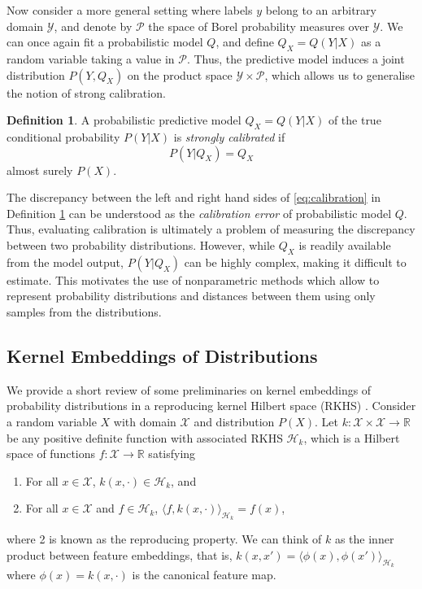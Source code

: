 \documentclass[twocolumn]{article}
\theoremstyle{definition}
\newtheorem{definition}[theorem]{Definition}
\begin{document}
Now consider a more general setting where labels $y$ belong to an arbitrary domain $\mathcal{Y}$, and denote by $\mathcal{P}$ the space of Borel probability measures over $\mathcal{Y}$. We can once again fit a probabilistic model $Q$, and define $Q_X = Q(Y|X)$ as a random variable taking a value in $\mathcal{P}$. Thus, the predictive model induces a joint distribution $P(Y, Q_X)$ on the product space $\mathcal{Y} \times \mathcal{P}$, which allows us to generalise the notion of strong calibration. 
\begin{definition} \label{def:calibration}
    A probabilistic predictive model $Q_X = Q(Y|X)$ of the true conditional probability $P(Y|X)$ is \emph{strongly calibrated} if 
    \begin{equation} \label{eq:calibration}
        P(Y|Q_X) = Q_X
    \end{equation}
    almost surely $P(X)$.
\end{definition}
The discrepancy between the left and right hand sides of \eqref{eq:calibration} in Definition \ref{def:calibration} can be understood as the \emph{calibration error} of probabilistic model $Q$. Thus, evaluating calibration is ultimately a problem of measuring the discrepancy between two probability distributions. However, while $Q_X$ is readily available from the model output, $P(Y|Q_X)$ can be highly complex, making it difficult to estimate. This motivates the use of nonparametric methods which allow to represent probability distributions and distances between them using only samples from the distributions. 



\subsection{Kernel Embeddings of Distributions} \label{sec:kernel_emb}

We provide a short review of some preliminaries on kernel embeddings of probability distributions in a reproducing kernel Hilbert space (RKHS) \citep{muandetKernelMeanEmbedding2017a}. Consider a random variable $X$ with domain $\mathcal{X}$ and distribution $P(X)$. Let $k:\mathcal{X} \times \mathcal{X} \to \mathbb{R}$ be any positive definite function with associated RKHS $\mathcal{H}_k$, which is a Hilbert space of functions $f:\mathcal{X} \to \mathbb{R}$ satisfying
\begin{enumerate}
    \item For all $x \in \mathcal{X}$, $k(x, \cdot) \in \mathcal{H}_k$, and
    \item For all $x \in \mathcal{X}$ and $f \in \mathcal{H}_k$, $\langle f, k(x, \cdot) \rangle_{\mathcal{H}_k} = f(x)$,
\end{enumerate}
where 2 is known as the reproducing property. We can think of $k$ as the inner product between feature embeddings, that is, $k(x, x') = \langle \phi(x), \phi(x') \rangle_{\mathcal{H}_k}$ where $\phi(x) = k(x, \cdot)$ is the canonical feature map. 
\end{document}
